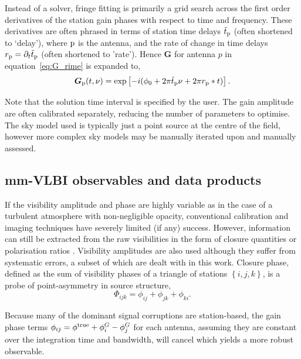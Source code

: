 Instead of a solver, fringe fitting is primarily a grid search across the first order derivatives of the station gain phases with respect to time and frequency. These derivatives are often phrased in terms of station time delays $\tilde{t}_{\rm p}$ (often shortened to `delay'), where ${\rm p}$ is the antenna, and the rate of change in time delays $r_{\rm p} = \partial_t \tilde{t}_{\rm p}$  (often shortened to 'rate'). Hence $\bm G$ for antenna $p$ in equation~\ref{eq:G_rime} is expanded to,
\begin{equation}
\boldsymbol G_{\rm p}(t,\nu) = \exp\left[-i(\phi_0 +2\pi\tilde{t}_{\rm p}\nu + 2\pi r_{\rm p}*t)\right].
\end{equation}


Note that the solution time interval is specified by the user. The gain amplitude are often calibrated separately, reducing the number of parameters to optimise. The sky model used is typically just a point source at the centre of the field, however more complex sky models may be manually iterated upon and manually assessed. 

\subsection{mm-VLBI observables and data products}\label{data_products}

If the visibility amplitude and phase are highly variable as in the case of a turbulent atmosphere with non-negligible opacity,  conventional calibration and imaging techniques have severely limited (if any) success. However, information can still be extracted from the raw visibilities in the form of closure quantities \citep{Monnier_2007} or polarisation ratios \citep{Fish_2009}. Visibility amplitudes are also used although they suffer from systematic errors, a subset of which are dealt with in this work. Closure phase, defined as the sum of visibility phases of a triangle of stations $\left\{i,j,k\right\}$, is a probe of point-asymmetry in source structure,
\begin{equation}
\Phi_{ijk} = \phi_{ij}+\phi_{jk}+\phi_{ki}.
\end{equation}

\noindent Because many of the dominant signal corruptions are station-based, the gain phase terms $\phi_{ij}=\phi^{\rm true}+ \phi^G_i -\phi^G_j$ for each antenna, assuming they are constant over the integration time and bandwidth, will cancel which yields a more robust observable.  

